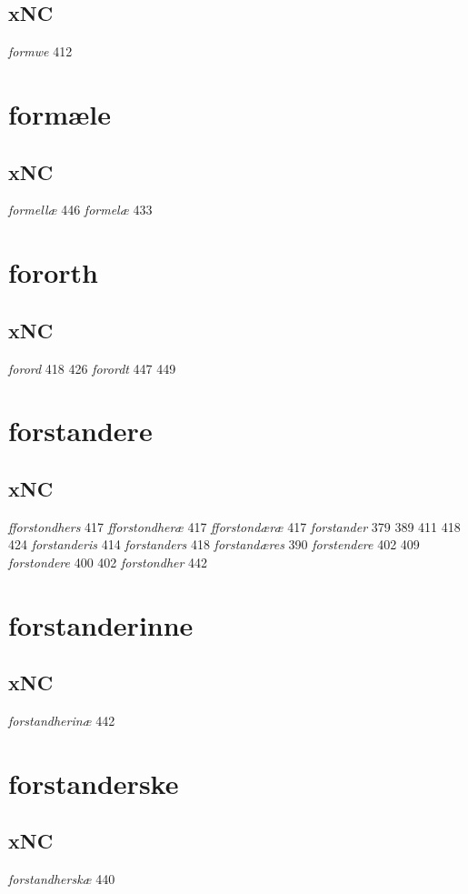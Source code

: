 \documentclass[a4paper,twocolumn]{article}
\begin{document}
\subsection{xNC}
\label{sec:orgfd94628}
\emph{formwe} 412 
\section{formæle}
\label{sec:orgdbd7d12}
\subsection{xNC}
\label{sec:orgb150b91}
\emph{formellæ} 446 \emph{formelæ} 433 
\section{fororth}
\label{sec:orgf9eee5f}
\subsection{xNC}
\label{sec:org37b6990}
\emph{forord} 418 426 \emph{forordt} 447 449 
\section{forstandere}
\label{sec:org60eb697}
\subsection{xNC}
\label{sec:orgb550cda}
\emph{fforstondhers} 417 \emph{fforstondheræ} 417 \emph{fforstondæræ} 417 \emph{forstander} 379 389 411 418 424 \emph{forstanderis} 414 \emph{forstanders} 418 \emph{forstandæres} 390 \emph{forstendere} 402 409 \emph{forstondere} 400 402 \emph{forstondher} 442 
\section{forstanderinne}
\label{sec:org45006f3}
\subsection{xNC}
\label{sec:org43b9af2}
\emph{forstandherinæ} 442 
\section{forstanderske}
\label{sec:orgaa4ef72}
\subsection{xNC}
\label{sec:orgd82e503}
\emph{forstandherskæ} 440 
\end{document}
